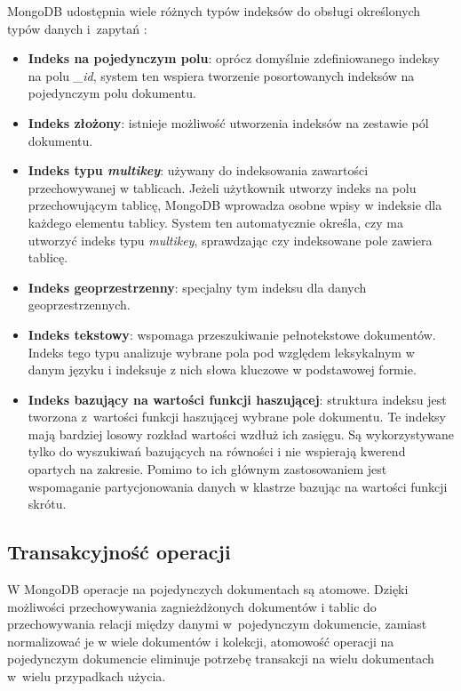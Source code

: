 MongoDB udostępnia wiele różnych typów indeksów do obsługi określonych typów danych i~zapytań \cite{MongoDBIndexes}:
\begin{itemize}
    \item \textbf{Indeks na pojedynczym polu}: oprócz domyślnie zdefiniowanego indeksy na polu \textit{\_id}, system ten wspiera tworzenie posortowanych indeksów na pojedynczym polu dokumentu.
    \item \textbf{Indeks złożony}: istnieje możliwość utworzenia indeksów na zestawie pól dokumentu.
    \item \textbf{Indeks typu \textit{multikey}}: używany do indeksowania zawartości przechowywanej w tablicach.
    Jeżeli użytkownik utworzy indeks na polu przechowującym tablicę, MongoDB wprowadza osobne wpisy w indeksie dla każdego elementu tablicy.
    System ten automatycznie określa, czy ma utworzyć indeks typu \textit{multikey}, sprawdzając czy indeksowane pole zawiera tablicę.
    \item \textbf{Indeks geoprzestrzenny}: specjalny tym indeksu dla danych geoprzestrzennych.
    \item \textbf{Indeks tekstowy}: wspomaga przeszukiwanie pełnotekstowe dokumentów.
    Indeks tego typu analizuje wybrane pola pod względem leksykalnym w danym języku i indeksuje z nich słowa kluczowe w podstawowej formie.
    \item \textbf{Indeks bazujący na wartości funkcji haszującej}: struktura indeksu jest tworzona z~wartości funkcji haszującej wybrane pole dokumentu.
    Te indeksy mają bardziej losowy rozkład wartości wzdłuż ich zasięgu. 
    Są wykorzystywane tylko do wyszukiwań bazujących na równości i nie wspierają kwerend opartych na zakresie.
    Pomimo to ich głównym zastosowaniem jest wspomaganie partycjonowania danych w klastrze bazując na wartości funkcji skrótu.
\end{itemize}

\subsection{Transakcyjność operacji}

W MongoDB operacje na pojedynczych dokumentach są atomowe.
Dzięki możliwości przechowywania zagnieżdżonych dokumentów i tablic do przechowywania relacji między danymi w~pojedynczym dokumencie, zamiast normalizować je w wiele dokumentów i kolekcji, atomowość operacji na pojedynczym dokumencie eliminuje potrzebę transakcji na wielu dokumentach w~wielu przypadkach użycia.

